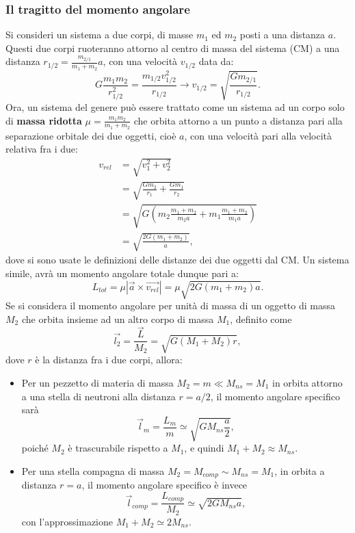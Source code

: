 \subsubsection{Il tragitto del momento angolare}
Si consideri un sistema a due corpi, di masse $m_1$ ed $m_2$ posti a una distanza $a$. 
Questi due corpi ruoteranno attorno al centro di massa del sistema (CM) a una distanza $r_{1/2}=\frac{m_{2/1}}{m_1+m_2}a$, con una velocità $v_{1/2}$ data da:
\begin{equation}
    G\frac{m_1m_2}{r_{1/2}^2} = \frac{m_{1/2}v_{1/2}^2}{r_{1/2}}\xrightarrow{}v_{1/2} = \sqrt{\frac{Gm_{2/1}}{r_{1/2}}}. 
\end{equation}
Ora, un sistema del genere può essere trattato come un sistema ad un corpo solo di \textbf{massa ridotta} $\mu = \frac{m_1m_2}{m_1+m_2}$ che orbita attorno a un punto a distanza pari alla separazione orbitale dei due oggetti, cioè $a$, con una velocità pari alla velocità relativa fra i due:
\begin{align*}
    v_{rel}&=\sqrt{v_1^2 + v_2^2}\\
           &=\sqrt{\displaystyle\frac{Gm_2}{r_1}+\displaystyle\frac{Gm_1}{r_2}}\\
           &=\sqrt{G\left( m_2 \frac{m_1+m_2}{m_2a} + m_1\displaystyle\frac{m_1+m_2}{m_1a} \right)}\\
           &=\sqrt{\frac{2G(m_1+m_2)}{a}},
\end{align*}
dove si sono usate le definizioni delle distanze dei due oggetti dal CM.
Un sistema simile, avrà un momento angolare totale dunque pari a: 
\begin{equation}
    L_{tot} = \mu |\vec{a}\times \vec{v_{rel}} |= \mu\sqrt{2G(m_1+m_2)a}. 
    \label{eq: Momento angolare totale sistema a due corpi ridotto}
\end{equation}
Se si considera il momento angolare per unità di massa di un oggetto di massa $M_2$ che orbita insieme ad un altro corpo di massa $M_1$, definito come
\begin{equation}
    \vec{l_2} = \frac{\vec{L}}{M_2} = \sqrt{G(M_1+M_2)r},
\end{equation}
dove $r$ è la distanza fra i due corpi, allora:
\begin{itemize}
    \item Per un pezzetto di materia di massa $M_2 = m \ll M_{ns} = M_1$ in orbita attorno a una stella di neutroni alla distanza $r = a/2$, il momento angolare specifico sarà
    \begin{equation}
        \vec{l}_m = \frac{L_m}{m} \simeq \sqrt{GM_{ns}\frac{a}{2}},
    \end{equation}
    poiché $M_2$ è trascurabile rispetto a $M_1$, e quindi $M_1 + M_2 \approx M_{ns}$.
    \item Per una stella compagna di massa $M_2 = M_{comp} \sim M_{ns} = M_1$, in orbita a distanza $r = a$, il momento angolare specifico è invece
    \begin{equation}
        \vec{l}_{comp} = \frac{L_{comp}}{M_2} \simeq \sqrt{2GM_{ns}a},
    \end{equation}
    con l'approssimazione $M_1 + M_2 \simeq 2M_{ns}$.
\end{itemize}
